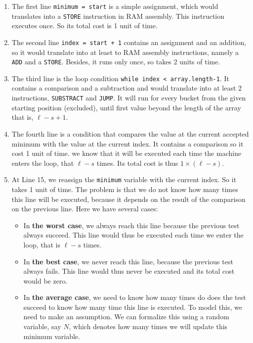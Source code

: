 \documentclass[11pt]{article}
\begin{document}
\begin{enumerate}
\item The first line \texttt{minimum = start} is a simple assignment, which
would translates into a \texttt{STORE} instruction in RAM assembly. This
instruction executes once. So its total cost is 1 unit of time.

\item The second line \texttt{index = start + 1} contains an assignment and an
addition, so it would translate into at least to RAM assembly
instructions, namely a \texttt{ADD} and a \texttt{STORE}. Besides, it runs only
once, so takes 2 units of time.

\item The third line is the loop condition \texttt{while index <
     array.length-1}. It contains a comparison and a subtraction and
would translate into at least 2 instructions, \texttt{SUBSTRACT} and
\texttt{JUMP}. It will run for every bucket from the given starting
position (excluded), until first value beyond the length of the
array that is, \(\ell-s+1\).

\item The fourth line is a condition that compares the value at the
current accepted minimum with the value at the current index.  It
contains a comparison so it cost 1 unit of time. we know that it
will be executed each time the machine enters the loop, that
\(\ell-s\) times. Its total cost is thus \(1 \times (\ell-s)\).

\item At Line 15, we reassign the \texttt{minimum} variable with the current
index. So it takes 1 unit of time. The problem is that we do not
know how many times this line will be executed, because it
depends on the result of the comparison on the previous
line. Here we have several cases:

\begin{itemize}
\item In \textbf{the worst case}, we always reach this line because the
previous test always succeed. This line would thus be executed
each time we enter the loop, that is \(\ell-s\) times.

\item In \textbf{the best case}, we never reach this line, because the
previous test always fails. This line would thus never be
executed and its total cost would be zero.

\item In \textbf{the average case}, we need to know how many times do does the
test succeed to know how many time this line is executed. To
model this, we need to make an assumption. We can formalize
this using a random variable, say \(N\), which denotes how many
times we will update this minimum variable.


\end{itemize}
\end{enumerate}
\end{document}
